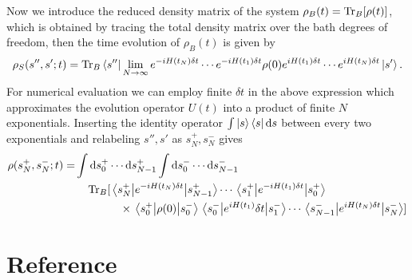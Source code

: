 \documentclass[11pt]{book}
\begin{document}
Now we introduce the reduced density matrix of the system
\(\rho_B(t)=\Tr_B[\rho(t)]\), which is obtained by tracing the total
density matrix over the bath degrees of freedom, then the time
evolution of \(\rho_B(t)\) is given by 
\begin{equation}
\rho_S(s'',s';t)=\Tr_B\bra{s''}
\lim_{N\to\infty}e^{-iH(t_N)\delta t}\cdots e^{-iH(t_1)\delta t}
\rho(0)e^{iH(t_1)\delta t}\cdots e^{iH(t_N)\delta t}\ket{s'}.
\end{equation}
For numerical evaluation we can employ finite \(\delta t\) in the above
expression which approximates the evolution operator \(U(t)\) into a
product of finite \(N\) exponentials. Inserting the identity operator
\(\int\ket{s}\bra{s}\dd{s}\) between every two exponentials and
relabeling \(s'',s'\) as \(s_N^+,s_N^-\) gives
\begin{equation}
\begin{split}
\rho(s_N^+,s_N^-;t)=&\int\dd{s}_0^+\cdots\dd{s_{N-1}^+}\int\dd{s_0^-}\cdots\dd{s_{N-1}^-}\\
&\quad\Tr_B[\mel{s_N^+}{e^{-iH(t_N)\delta t}}{s_{N-1}^+}\cdots
\mel{s_1^+}{e^{-iH(t_1)\delta t}}{s_0^+}\\
&\qquad\qquad\times\mel{s_0^+}{\rho(0)}{s_0^-}
\mel{s_0^-}{e^{iH(t_1)}\delta t}{s_1^-}\cdots
\mel{s_{N-1}^-}{e^{iH(t_N)\delta t}}{s_N^-}]
\end{split}
\end{equation}

\chapter{Reference}
\label{sec:org93c72ee}


\end{document}
